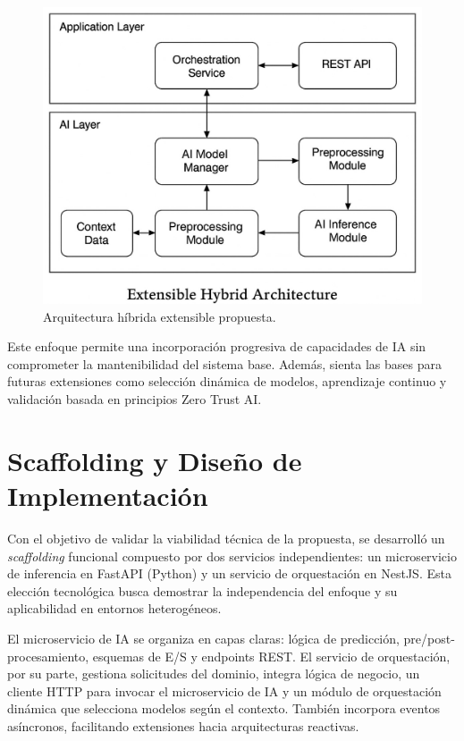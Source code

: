 \documentclass[a4paper]{llncs}
\begin{document}
\begin{figure}[h]
    \centering
    \includegraphics[width=0.8\linewidth]{A_flowchart_in_black_and_white_illustrates_the_ext.jpeg}
    \caption{Arquitectura híbrida extensible propuesta.}
    \label{fig:arquitectura}
\end{figure}

Este enfoque permite una incorporación progresiva de capacidades de IA sin comprometer la mantenibilidad del sistema base. Además, sienta las bases para futuras extensiones como selección dinámica de modelos, aprendizaje continuo y validación basada en principios Zero Trust AI.








\section{Scaffolding y Diseño de Implementación}

Con el objetivo de validar la viabilidad técnica de la propuesta, se desarrolló un \textit{scaffolding} funcional compuesto por dos servicios independientes: un microservicio de inferencia en FastAPI (Python) y un servicio de orquestación en NestJS. Esta elección tecnológica busca demostrar la independencia del enfoque y su aplicabilidad en entornos heterogéneos.

El microservicio de IA se organiza en capas claras: lógica de predicción, pre/post-procesamiento, esquemas de E/S y endpoints REST. El servicio de orquestación, por su parte, gestiona solicitudes del dominio, integra lógica de negocio, un cliente HTTP para invocar el microservicio de IA y un módulo de orquestación dinámica que selecciona modelos según el contexto. También incorpora eventos asíncronos, facilitando extensiones hacia arquitecturas reactivas.
\end{document}

